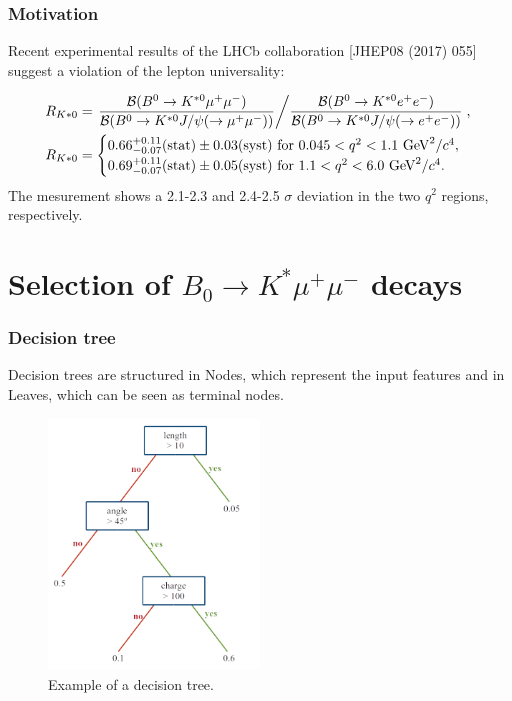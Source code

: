 \documentclass{beamer}
\begin{document}
\begin{frame}
  \frametitle{Motivation}

Recent experimental results of the LHCb collaboration [JHEP08 (2017) 055] suggest a violation of the lepton universality:

  \begin{equation}
\begin{split}
R_{K*0} &= \left. \dfrac{\mathcal{B}(B^0 \rightarrow K^{*0} \mu^+ \mu^-)}{\mathcal{B}(B^0 \rightarrow K^{*0} J/\psi(\rightarrow \mu^+ \mu^-))} \middle/   \dfrac{\mathcal{B}(B^0 \rightarrow K^{*0} e^+ e^-)}{\mathcal{B} ( B^0 \rightarrow K^{*0} J/\psi(\rightarrow e^+ e^-))}  \right. , \\
R_{K*0} &=   \begin{cases}
  0.66^{+0.11}_{-0.07} (\text{stat}) \pm 0.03 (\text{syst}) \text{ for } 0.045 < q^2 < 1.1 \text{ GeV}^2/c^4, \\
  0.69^{+0.11}_{-0.07} (\text{stat}) \pm 0.05 (\text{syst}) \text{ for } 1.1 < q^2 < 6.0 \text{ GeV}^2/c^4.
\end{cases}
\end{split}
\end{equation}
The mesurement shows a 2.1-2.3 and 2.4-2.5 $\sigma$ deviation in the two $q^2$ regions, respectively.

\end{frame}




\section{Selection of $B_0 \rightarrow K^* \mu^+ \mu^-$ decays}



\begin{frame}
  \frametitle{Decision tree}

Decision trees are structured in Nodes, which represent the input features and in Leaves, which can be seen as terminal nodes.

  \begin{figure}
   \includegraphics[width=0.5\textwidth]{figures/decision_tree}
   \caption{Example of a decision tree.}
   \label{fig:tree}
  \end{figure}
\end{frame}
\end{document}
